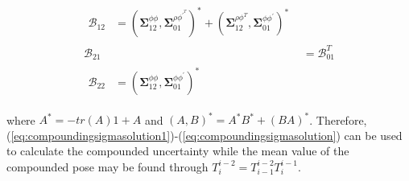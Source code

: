 \documentclass[letterpaper, 10 pt]{ieeeconf}  %
\begin{document}
\begin{align}
\begin{split}
\end{split}\\
\begin{split}
\mathcal{B}_{12} &= (\boldsymbol{\Sigma}_{12}^{\phi\phi}, \boldsymbol{\Sigma}_{01}^{\rho\phi^{\prime^T}})^*+(\boldsymbol{\Sigma}_{12}^{\rho\phi^T}, \boldsymbol{\Sigma}_{01}^{\phi\phi^\prime})^*
\end{split}\\
\mathcal{B}_{21} &= \mathcal{B}_{01}^T\\
\begin{split}
\mathcal{B}_{22} &= (\boldsymbol{\Sigma}_{12}^{\phi\phi}, \boldsymbol{\Sigma}_{01}^{\phi\phi^{\prime}})^*
\end{split}
\label{eq:compoundingsigmasolution}
\end{align}

where $A^* = -tr(A)1 + A$ and $(A, B)^* = A^*B^*+(BA)^*$. Therefore, (\ref{eq:compoundingsigmasolution1})-(\ref{eq:compoundingsigmasolution}) can be used to calculate the compounded uncertainty while the mean value of the compounded pose may be found through $T^{i-2}_{i} =  T^{i-2}_{i-1}T^{i-1}_{i}$.
\end{document}

